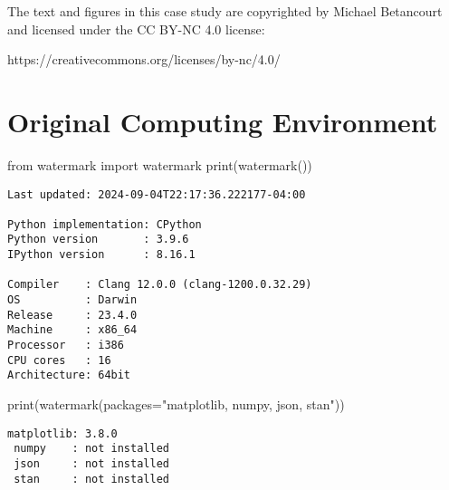 \documentclass[
  letterpaper,
  DIV=11,
  numbers=noendperiod]{scrartcl}
\newenvironment{Shaded}{\begin{snugshade}}{\end{snugshade}}
\newcommand{\BuiltInTok}[1]{\textcolor[rgb]{0.00,0.23,0.31}{#1}}
\newcommand{\ImportTok}[1]{\textcolor[rgb]{0.00,0.46,0.62}{#1}}
\newcommand{\NormalTok}[1]{\textcolor[rgb]{0.00,0.23,0.31}{#1}}
\newcommand{\OperatorTok}[1]{\textcolor[rgb]{0.37,0.37,0.37}{#1}}
\newcommand{\StringTok}[1]{\textcolor[rgb]{0.13,0.47,0.30}{#1}}
\begin{document}
The text and figures in this case study are copyrighted by Michael
Betancourt and licensed under the CC BY-NC 4.0 license:

https://creativecommons.org/licenses/by-nc/4.0/

\section*{Original Computing
Environment}\label{original-computing-environment}

\begin{Shaded}
\begin{Highlighting}[]
\ImportTok{from}\NormalTok{ watermark }\ImportTok{import}\NormalTok{ watermark}
\BuiltInTok{print}\NormalTok{(watermark())}
\end{Highlighting}
\end{Shaded}

\begin{verbatim}
Last updated: 2024-09-04T22:17:36.222177-04:00

Python implementation: CPython
Python version       : 3.9.6
IPython version      : 8.16.1

Compiler    : Clang 12.0.0 (clang-1200.0.32.29)
OS          : Darwin
Release     : 23.4.0
Machine     : x86_64
Processor   : i386
CPU cores   : 16
Architecture: 64bit
\end{verbatim}

\begin{Shaded}
\begin{Highlighting}[]
\BuiltInTok{print}\NormalTok{(watermark(packages}\OperatorTok{=}\StringTok{"matplotlib, numpy, json, stan"}\NormalTok{))}
\end{Highlighting}
\end{Shaded}

\begin{verbatim}
matplotlib: 3.8.0
 numpy    : not installed
 json     : not installed
 stan     : not installed
\end{verbatim}
\end{document}

